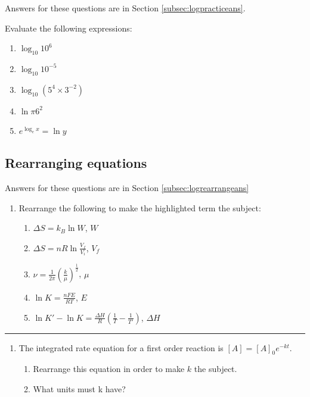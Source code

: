 \documentclass[
]{book}
\providecommand{\tightlist}{%
  \setlength{\itemsep}{0pt}\setlength{\parskip}{0pt}}
\begin{document}
Answers for these questions are in Section \ref{subsec:logpracticeans}.

Evaluate the following expressions:

\begin{enumerate}
\def\labelenumi{\arabic{enumi}.}
\tightlist
\item
  \(\log_{10} 10^6\)
\item
  \(\log_{10} 10^{-5}\)
\item
  \(\log_{10} (5^4 \times 3^{-2})\)
\item
  \(\ln {\pi 6^2}\)
\item
  \(e^{\log_e x}=\ln y\)
\end{enumerate}

\hypertarget{sec:logrearrange}{%
\subsection{Rearranging equations}\label{sec:logrearrange}}

Answers for these questions are in Section \ref{subsec:logrearrangeans}

\begin{enumerate}
\def\labelenumi{\arabic{enumi}.}
\tightlist
\item
  Rearrange the following to make the highlighted term the subject:

  \begin{enumerate}
  \def\labelenumii{\alph{enumii}.}
  \tightlist
  \item
    \(\Delta S = k_B \ln W\), \(W\)
  \item
    \(\Delta S = nR \ln \frac{V_f}{V_i}\), \(V_f\)
  \item
    \(\nu =\frac{1}{2 \pi} \left(\frac{k}{\mu}\right)^\frac{1}{2}\), \(\mu\)
  \item
    \(\ln K = \frac{nFE}{RT}\), \(E\)
  \item
    \(\ln K'- \ln K = \frac{\Delta H}{R}\left(\frac{1}{T}-\frac{1}{T'}\right)\), \(\Delta H\)
  \end{enumerate}
\end{enumerate}

\begin{center}\rule{0.5\linewidth}{0.5pt}\end{center}

\begin{enumerate}
\def\labelenumi{\arabic{enumi}.}
\setcounter{enumi}{1}
\tightlist
\item
  The integrated rate equation for a first order reaction is \([A]=[A]_0 e^{-kt}\).

  \begin{enumerate}
  \def\labelenumii{\alph{enumii}.}
  \tightlist
  \item
    Rearrange this equation in order to make \(k\) the subject.
  \item
    What units must k have?
  \end{enumerate}
\end{enumerate}
\end{document}
